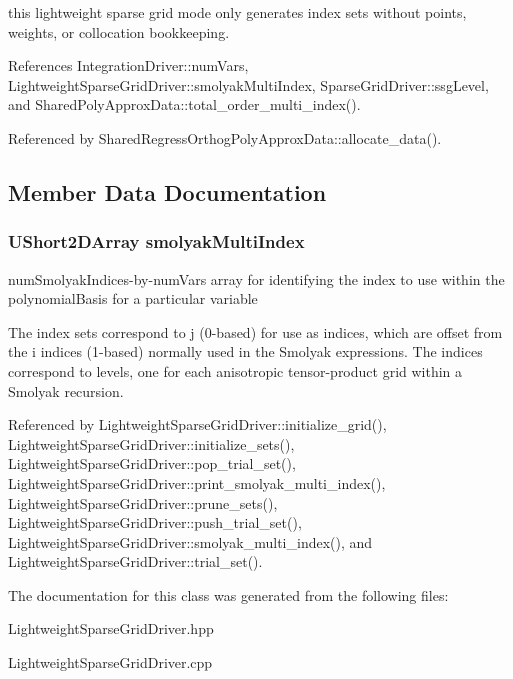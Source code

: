 this lightweight sparse grid mode only generates index sets without points, weights, or collocation bookkeeping. 

References Integration\+Driver\+::num\+Vars, Lightweight\+Sparse\+Grid\+Driver\+::smolyak\+Multi\+Index, Sparse\+Grid\+Driver\+::ssg\+Level, and Shared\+Poly\+Approx\+Data\+::total\+\_\+order\+\_\+multi\+\_\+index().



Referenced by Shared\+Regress\+Orthog\+Poly\+Approx\+Data\+::allocate\+\_\+data().



\subsection{Member Data Documentation}
\subsubsection[{\texorpdfstring{smolyak\+Multi\+Index}{smolyakMultiIndex}}]{\setlength{\rightskip}{0pt plus 5cm}U\+Short2\+D\+Array smolyak\+Multi\+Index\hspace{0.3cm}{\ttfamily [private]}}\label{classPecos_1_1LightweightSparseGridDriver_a189de9f4451d4da64b46cff2b4b1ba0d}


num\+Smolyak\+Indices-\/by-\/num\+Vars array for identifying the index to use within the polynomial\+Basis for a particular variable 

The index sets correspond to j (0-\/based) for use as indices, which are offset from the i indices (1-\/based) normally used in the Smolyak expressions. The indices correspond to levels, one for each anisotropic tensor-\/product grid within a Smolyak recursion. 

Referenced by Lightweight\+Sparse\+Grid\+Driver\+::initialize\+\_\+grid(), Lightweight\+Sparse\+Grid\+Driver\+::initialize\+\_\+sets(), Lightweight\+Sparse\+Grid\+Driver\+::pop\+\_\+trial\+\_\+set(), Lightweight\+Sparse\+Grid\+Driver\+::print\+\_\+smolyak\+\_\+multi\+\_\+index(), Lightweight\+Sparse\+Grid\+Driver\+::prune\+\_\+sets(), Lightweight\+Sparse\+Grid\+Driver\+::push\+\_\+trial\+\_\+set(), Lightweight\+Sparse\+Grid\+Driver\+::smolyak\+\_\+multi\+\_\+index(), and Lightweight\+Sparse\+Grid\+Driver\+::trial\+\_\+set().



The documentation for this class was generated from the following files\+:\begin{DoxyCompactItemize}
\item 
Lightweight\+Sparse\+Grid\+Driver.\+hpp\item 
Lightweight\+Sparse\+Grid\+Driver.\+cpp\end{DoxyCompactItemize}
